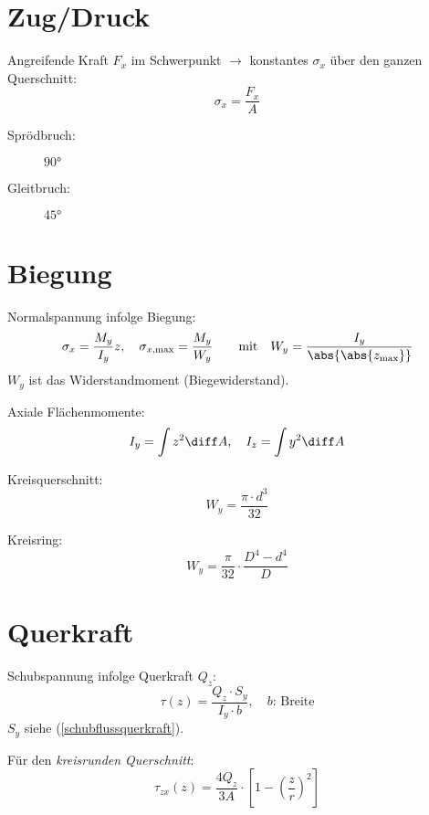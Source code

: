 
\section{Zug/Druck} %
	Angreifende Kraft $F_x$ im Schwerpunkt $\rightarrow$ konstantes $\sigma_x$ über den ganzen Querschnitt:
	\begin{equation*}
		\sigma_x = \frac{F_x}{A}
	\end{equation*}
	\begin{description}
		\item[Sprödbruch:] $\ang{90}$
		\item[Gleitbruch:] $\ang{45}$
	\end{description}
\section{Biegung} %
	Normalspannung infolge Biegung:
	\begin{equation*}
		\sigma_x = \frac{M_y}{I_y}z, \quad \sigma_{x\text{,max}}= \frac{M_y}{W_y} \qquad \text{mit}\quad W_y = \frac{I_y}{\abs{\abs{z_{\text{max}}}}}
	\end{equation*}
	$W_y$ ist das Widerstandmoment (Biegewiderstand).
	
	Axiale Flächenmomente:
	\begin{equation*}
		I_y = \int z^2 \diff A, \quad I_z = \int y^2 \diff A
	\end{equation*}
	
	Kreisquerschnitt:
	\begin{equation*}
		W_y = \frac{\pi \cdot d^3}{32}
	\end{equation*}
	
	Kreisring:
	\begin{equation*}
		W_y = \frac{\pi}{32}\cdot \frac{D^4-d^4}{D}
	\end{equation*}
\section{Querkraft} %
	Schubspannung infolge Querkraft $Q_z$:
	\begin{equation*}
		\tau(z) = \frac{Q_z \cdot S_y}{I_y\cdot b}, \quad b\text{: Breite}
	\end{equation*}
	$S_y$ siehe (\ref{schubflussquerkraft}).
	
	Für den \emph{kreisrunden Querschnitt}:
	\begin{equation*}
		\tau_{zx}(z) = \frac{4Q_z}{3A}\cdot \left[ 1-\left( \frac{z}{r}\right)^2\right]
	\end{equation*}
	

